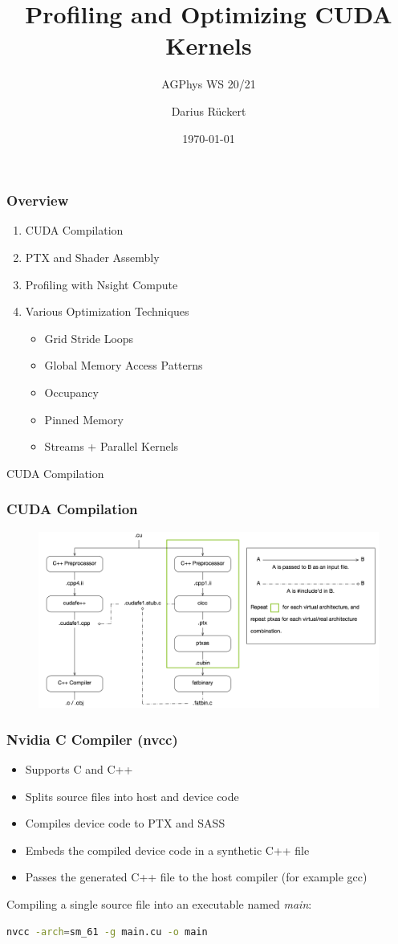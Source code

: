 \documentclass[aspectratio=169,handout]{beamer}
\subtitle{AGPhys WS 20/21                                                                                                 }
\title{Profiling and Optimizing CUDA Kernels}
\author[Darius Rückert]{Darius Rückert}
\date{\today}
\begin{document}
\frame
{
	\titlepage
}

\frame
{
	\frametitle{Overview}
		\begin{enumerate}
		\item CUDA Compilation
		\item PTX and Shader Assembly
		\item Profiling with Nsight Compute
		\item Various Optimization Techniques
		\begin{itemize}
		\item Grid Stride Loops
		\item Global Memory Access Patterns
		\item Occupancy
		\item Pinned Memory
		\item Streams + Parallel Kernels
		\end{itemize}
		\end{enumerate}
}

\frame
{
\begin{center}
\Large CUDA Compilation
\end{center}
}


\frame
{
	\frametitle{CUDA Compilation}
		\begin{figure}
	\centering
	\includegraphics[height=0.95\textheight]{nvcc}
\end{figure}
}


\begin{frame}[fragile]
	\frametitle{Nvidia C Compiler (nvcc)}
	\begin{itemize}
		\item Supports C and C++
		\item Splits source files into host and device code
		\item Compiles device code to PTX and SASS
		\item Embeds the compiled device code in a synthetic C++ file
		\item Passes the generated C++ file to the host compiler (for example gcc)
	\end{itemize}	
Compiling a single source file into an executable named \textit{main}:
\begin{lstlisting}[language=bash]
nvcc -arch=sm_61 -g main.cu -o main
\end{lstlisting}
\end{frame}
\end{document}
